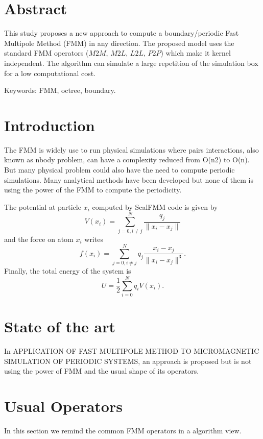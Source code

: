 \documentclass[12pt]{article} %
\begin{document}
\newpage %

\section{Abstract}

This study proposes a new approach to compute a boundary/periodic Fast Multipole Method (FMM) in any direction.
The proposed model uses the standard FMM operators ($M2M$, $M2L$, $L2L$, $P2P$) which make it kernel independent.
The algorithm can simulate a large repetition of the simulation box for a low computational cost.

Keywords: FMM, octree, boundary.

\section{Introduction}
The FMM is widely use to run physical simulations where pairs interactions, also known as nbody problem,
can have a complexity reduced from O(n2) to O(n).
But many physical problem could also have the need to compute periodic simulations.
Many analytical methods have been developed but none of them is using the power of the FMM to compute the periodicity.

The potential at particle $x_i$ computed by ScalFMM code is given by
$$
V(x_i) = \sum_{j=0,i\neq j}^{N}{\frac{q_j}{\|x_i-x_j\|}}
$$ 
and the force on atom $x_i$ writes
$$
f(x_i) =  \sum_{j=0,i\neq j}^{N}{q_j\frac{x_i-x_j}{\|x_i-x_j\|^3}}.
$$
Finally, the total energy of the system is
$$
U = \frac{1}{2}\sum_{i=0}^{N}{q_i V(x_i)}.
$$ 

\section{State of the art}

In APPLICATION OF FAST MULTIPOLE METHOD TO MICROMAGNETIC SIMULATION OF PERIODIC SYSTEMS, an approach is proposed but
is not using the power of FMM and the usual shape of its operators.

\section{Usual Operators}
In this section we remind the common FMM operators in a algorithm view.
\end{document}
